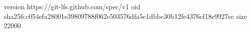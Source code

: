 version https://git-lfs.github.com/spec/v1
oid sha256:c054efa28001e39809788f062e503576dfa5e1dbbc30b12fe4376cf18e9927ec
size 22000
